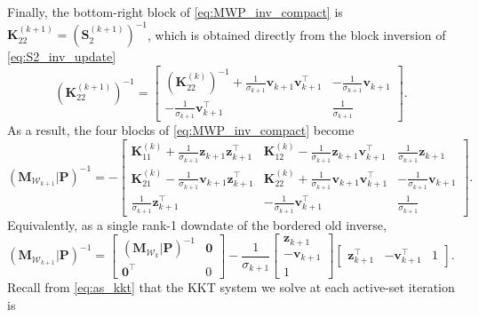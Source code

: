 \documentclass[a4paper,12pt,openany]{book}
\newcommand{\K}{\mathbf{K}}
\newcommand{\M}{\mathbf{M}}
\renewcommand{\P}{\mathbf{P}}
\renewcommand{\v}{\mathbf{v}}
\newcommand{\z}{\mathbf{z}}
\begin{document}
\begin{appendices}
Finally, the bottom-right block of \eqref{eq:MWP_inv_compact} is $\mathbf{K}_{22}^{(k+1)}=(\mathbf{S}_2^{(k+1)})^{-1}$, which is obtained directly from the block inversion of \eqref{eq:S2_inv_update}
\begin{equation}
(\K_{22}^{(k+1)})^{-1} = \begin{bmatrix} (\K_{22}^{(k)})^{-1} + \frac{1}{\sigma_{k+1}}\v_{k+1}\v_{k+1}^\top & -\frac{1}{\sigma_{k+1}}\v_{k+1} \\[2pt] -\frac{1}{\sigma_{k+1}}\v_{k+1}^\top & \frac{1}{\sigma_{k+1}} \end{bmatrix}.
\end{equation}
As a result, the four blocks of \eqref{eq:MWP_inv_compact} become
\begin{equation}
	\label{eq:MWP_inv_update}
	(\M_{\mathcal{W}_{k+1}}|\P)^{-1}
	=
	-\begin{bmatrix}
		\mathbf{K}_{11}^{(k)}+\frac{1}{\sigma_{k+1}}\z_{k+1}\z_{k+1}^\top &
		\mathbf{K}_{12}^{(k)}-\frac{1}{\sigma_{k+1}}\z_{k+1}\v_{k+1}^\top &
		\frac{1}{\sigma_{k+1}}\z_{k+1} \\[6pt]
		\mathbf{K}_{21}^{(k)}-\frac{1}{\sigma_{k+1}}\v_{k+1}\z_{k+1}^\top &
		\mathbf{K}_{22}^{(k)}+\frac{1}{\sigma_{k+1}}\v_{k+1}\v_{k+1}^\top &
		-\frac{1}{\sigma_{k+1}}\v_{k+1} \\[6pt]
		\frac{1}{\sigma_{k+1}}\z_{k+1}^\top &
		-\frac{1}{\sigma_{k+1}}\v_{k+1}^\top &
		\frac{1}{\sigma_{k+1}}
	\end{bmatrix}.
\end{equation}
Equivalently, as a single rank-1 downdate of the bordered old inverse,
\begin{equation}
	\label{eq:MWP_inv_update_rank1}
	(\M_{\mathcal{W}_{k+1}}|\P)^{-1}
	=
	\begin{bmatrix}
		(\M_{\mathcal{W}_{k}}|\P)^{-1} & \mathbf{0} \\[2pt]
		\mathbf{0}^\top & 0
	\end{bmatrix}
	-
	\frac{1}{\sigma_{k+1}}
	\begin{bmatrix}
		\z_{k+1} \\[2pt] -\v_{k+1} \\[2pt] 1
	\end{bmatrix}
	\begin{bmatrix}
		\z_{k+1}^\top & -\v_{k+1}^\top & 1
	\end{bmatrix}.
\end{equation}
Recall from \eqref{eq:as_kkt} that the KKT system we solve at each active-set iteration is
\begin{equation}

\end{equation}
\end{appendices}
\end{document}
